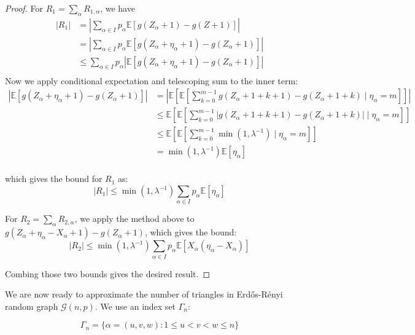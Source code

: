 \documentclass{article}
\begin{document}
\begin{proof}
    For $R_1=\sum_\alpha R_{1,\alpha}$, we have
    \begin{align*}
        |R_1| &= \left|\sum_{\alpha \in I} p_\alpha \mathbb{E}[g(Z_\alpha+1) - g(Z+1)]\right| \\
        &= \left|\sum_{\alpha \in I} p_\alpha \mathbb{E}[g(Z_\alpha + \eta_\alpha +1) - g(Z_\alpha+1)]\right|\\
        &\leq \sum_{\alpha \in I} p_\alpha |\mathbb{E}[g(Z_\alpha + \eta_\alpha +1) - g(Z_\alpha+1)]|\\
    \end{align*}
    Now we apply conditional expectation and telescoping sum to the inner term:
    \begin{align*}
        |\mathbb{E}[g(Z_\alpha + \eta_\alpha +1) - g(Z_\alpha+1)]| &= \left|\mathbb{E}\left[\mathbb{E}[\sum_{k=0}^{m-1} g(Z_\alpha + 1 + k+1) - g(Z_\alpha + 1 + k)\mid \eta_\alpha = m]\right]\right|\\
        &\leq \mathbb{E}\left[\mathbb{E}[\sum_{k=0}^{m-1} |g(Z_\alpha + 1 + k+1) - g(Z_\alpha + 1 + k)|\mid \eta_\alpha = m]\right]\\
        &\leq \mathbb{E}\left[\mathbb{E}[\sum_{k=0}^{m-1} \min (1, \lambda^{-1})\mid \eta_\alpha = m]\right]\\
        &= \min (1, \lambda^{-1}) \mathbb{E}[ \eta_\alpha]\\
    \end{align*}

    which gives the bound for $R_1$ as:
    \begin{equation*}
        |R_1| \leq \min (1, \lambda^{-1}) \sum_{\alpha \in I} p_\alpha \mathbb{E}[ \eta_\alpha]
    \end{equation*}

    For $R_2=\sum_\alpha R_{2,\alpha}$, we apply the method above to $g(Z_\alpha + \eta_\alpha - X_\alpha + 1) - g(Z_\alpha + 1)$, which gives the bound:
    \begin{equation*}
        |R_2| \leq \min (1, \lambda^{-1}) \sum_{\alpha \in I} p_\alpha \mathbb{E}[ X_\alpha (\eta_\alpha - X_\alpha)]
    \end{equation*}

    Combing those two bounds gives the desired result.
\end{proof}  

We are now ready to approximate the number of triangles in Erd\H{o}s-R\'{e}nyi random graph $\mathcal{G}(n,p)$.  We use an index set $\Gamma_n$:

\begin{equation*}
    \Gamma_{n}=\{\alpha=(u,v,w):1\leq u<v<w\leq n\}
\end{equation*}
\end{document}
